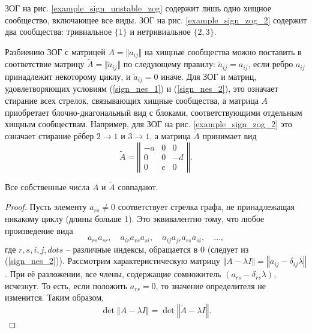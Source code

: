     ЗОГ на рис. \ref{example_sign_unstable_zog} содержит лишь одно хищное сообщество, включающее все виды. ЗОГ на рис. \ref{example_sign_zog_2} содержит два сообщества: тривиальное \(\{1\}\) и нетривиальное \(\{2,3\}\).

    Разбиению ЗОГ с матрицей \(A = \Vert a_{ij} \Vert\) на хищные сообщества можно поставить в соответствие матрицу \(\widetilde{A} = \Vert \widetilde{a}_{ij} \Vert\) по следующему правилу: \(\widetilde{a}_{ij} = a_{ij}\), если ребро \(a_{ij}\) принадлежит некоторому циклу, и \(\widetilde{a}_{ij} = 0\) иначе. Для ЗОГ и матриц, удовлетворяющих условиям (\ref{sign_nes_1}) и (\ref{sign_nes_2}), это означает стирание всех стрелок, связывающих хищные сообщества, а матрица \(A\) приобретает блочно-диагональный вид с блоками, соответствующими отдельным хищным сообществам. Например, для ЗОГ на рис. \ref{example_sign_zog_2} это означает стирание рёбер \(2 \to 1\) и \(3 \to 1\), а матрица \(\widetilde{A}\) принимает вид
    \begin{equation*}
        \widetilde{A} = \left\Vert \begin{array}{c|cc}
            -a & 0 & 0 \\ \hline
            0 & 0 & -d \\
            0 & e & 0 
        \end{array} \right\Vert.
    \end{equation*}

    \begin{lemma}
        Все собственные числа \(A\) и \(\widetilde{A}\) совпадают.
    \end{lemma}

    \begin{proof}
        Пусть элементу \(a_{rs} \neq 0\) соответствует стрелка графа, не принадлежащая никакому циклу (длины больше 1). Это эквивалентно тому, что любое произведение вида
        \begin{equation*}
            a_{rs} a_{sr}, \quad a_{ir} a_{rs} a_{si}, \quad a_{ij} a_{jr} a_{rs} a_{si}, \quad \dots,
        \end{equation*}
        где \(r,s,i,j,dots\) -- различные индексы, обращается в 0 (следует из (\ref{sign_nes_2})).
        Рассмотрим характеристическую матрицу \(\left\Vert A - \lambda I \right\Vert = \left\Vert a_{ij} - \delta_{ij} \lambda \right\Vert\). При её разложении, все члены, содержащие сомножитель \((a_{rs} - \delta_{rs} \lambda)\), исчезнут. То есть, если положить \(a_{rs} = 0\), то значение определителя не изменится. Таким образом,
        \begin{equation}
            \det \left\Vert A - \lambda I \right\Vert = \det \left\Vert \widetilde{A} - \lambda I \right\Vert.
        \end{equation}
    \end{proof}

